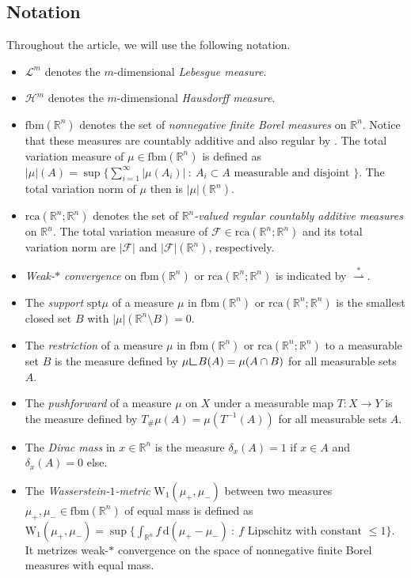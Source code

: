 \documentclass[10pt,a4paper,oneside,final]{article}
\newcommand{\R}{{\mathbb{R}}}
\newcommand{\de}{{\mathrm{d}}}
\newcommand{\lebesgue}{\mathcal{L}}
\newcommand{\hd}{\mathcal{H}}
\newcommand{\rca}{\mathrm{rca}}
\newcommand{\fbm}{{\mathrm{fbm}}}
\newcommand{\pushforward}[2]{{{#1}_{\#}#2}}
\newcommand{\restr}{{\mbox{\LARGE$\llcorner$}}}
\newcommand{\spt}{{\mathrm{spt}}}
\newcommand{\weakstarto}{\stackrel{*}{\rightharpoonup}}
\newcommand{\Wd}[1]{\mathrm{W}_{#1}}
\newcommand{\Wdone}{\Wd{1}}
\newcommand{\flux}{{\mathcal{F}}}
\numberwithin{equation}{section}
\theoremstyle{plain}
\theoremstyle{definition}
\theoremstyle{remark}
\begin{document}
\subsection{Notation}
Throughout the article, we will use the following notation.
\begin{itemize}
 \item $\lebesgue^m$ denotes the $m$-dimensional \emph{Lebesgue measure}.

 \item $\hd^m$ denotes the $m$-dimensional \emph{Hausdorff measure}.

 \item $\fbm(\R^n)$ denotes the set of \emph{nonnegative finite Borel measures} on $\R^n$. Notice that these measures are countably additive and also regular by \cite[Thm.\,2.18]{Ru87}.
 The total variation measure of $\mu\in\fbm(\R^n)$ is defined as $|\mu|(A)=\sup\{\sum_{i=1}^\infty|\mu(A_i)|\ :\ A_i\subset A\text{ measurable and disjoint }\}$.
 The total variation norm of $\mu$ then is $|\mu|(\R^n)$.

 \item $\rca(\R^n;\R^n)$ denotes the set of \emph{$\R^n$-valued regular countably additive measures} on $\R^n$.
 The total variation measure of $\flux\in\rca(\R^n;\R^n)$ and its total variation norm are $|\flux|$ and $|\flux|(\R^n)$, respectively.

 \item \emph{Weak-$*$ convergence} on $\fbm(\R^n)$ or $\rca(\R^n;\R^n)$ is indicated by $\weakstarto$.

 \item The \emph{support} $\spt\mu$ of a measure $\mu$ in $\fbm(\R^n)$ or $\rca(\R^n;\R^n)$ is the smallest closed set $B$ with $|\mu|(\R^n\setminus B)=0$.

 \item The \emph{restriction} of a measure $\mu$ in $\fbm(\R^n)$ or $\rca(\R^n;\R^n)$ to a measurable set $B$ is the measure defined by $\mu\restr B(A)=\mu(A\cap B)$ for all measurable sets $A$.

 \item The \emph{pushforward} of a measure $\mu$ on $X$ under a measurable map $T:X\to Y$ is the measure defined by $\pushforward T\mu(A)=\mu(T^{-1}(A))$ for all measurable sets $A$.

 \item The \emph{Dirac mass} in $x\in\R^n$ is the measure $\delta_x(A)=1$ if $x\in A$ and $\delta_x(A)=0$ else.
 
 \item The \emph{Wasserstein-$1$-metric} $\Wdone(\mu_+,\mu_-)$ between two measures $\mu_+,\mu_-\in\fbm(\R^n)$ of equal mass is defined as $\Wdone(\mu_+,\mu_-)=\sup\{\int_{\R^n}f\,\de(\mu_+-\mu_-)\ :\ f\text{ Lipschitz with constant }\leq1\}$.
 It metrizes weak-$*$ convergence on the space of nonnegative finite Borel measures with equal mass.
 

\end{itemize}
\end{document}
